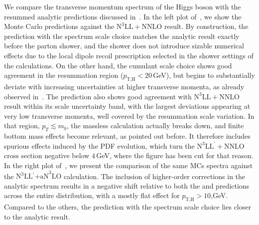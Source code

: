 \documentclass[11pt,a4paper]{article}
\begin{document}
We compare the transverse momentum spectrum of the Higgs boson with the resummed analytic predictions discussed in~. In the left plot of~, we show the Monte Carlo predictions against the $\text{N}^3\text{LL}+\text{NNLO}$ result. By construction, the \GENEVA{} prediction with the spectrum scale choice matches the analytic result exactly before the parton shower, and the shower does not introduce sizable numerical effects due to the local dipole
recoil prescription selected in the shower settings of the calculations. On the other hand, the cumulant scale choice shows good agreement in the resummation region ($p_{\text{T,H}} < 20$\,GeV), but begins to substantially deviate with increasing
uncertainties at higher transverse momenta, as already observed in~. The \minnlo{} prediction also shows good agreement with $\text{N}^3\text{LL}+\text{NNLO}$ result within its scale uncertainty band, with the largest deviations appearing at very low transverse momenta, well covered by the resummation scale variation.
In that region, $p_T\lesssim m_b$, the massless calculation actually 
breaks down, and finite bottom mass effects become relevant, as pointed out before.
It therefore includes spurious effects induced by the PDF evolution, which turn 
the $\text{N}^3\text{LL}^{\prime}+\text{NNLO}$ cross section negative below $4$\,GeV, where
the figure has been cut for that reason.
In the right plot of~, we present the comparison of the same MCs spectra against the $\text{N}^3\text{LL$^{\prime}$+aN}^3\text{LO}$ calculation. The inclusion of higher-order corrections in the analytic spectrum results in a negative shift relative to both the \minnlo{} and \GENEVA{} predictions across the entire distribution, with a mostly flat effect for $p_{\text{T,H}} > 10$,GeV. Compared to the others, the \GENEVA{} prediction with the spectrum scale choice lies closer to the analytic result.
\end{document}
